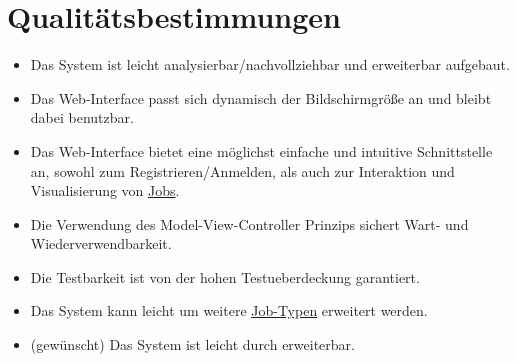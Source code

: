\section{Qualitätsbestimmungen}
\begin{itemize}    
    \item Das System ist leicht analysierbar/nachvollziehbar und erweiterbar aufgebaut.
    \item Das \gls{Web-Interface} passt sich dynamisch der Bildschirmgröße an und bleibt dabei benutzbar.
    \item Das \gls{Web-Interface} bietet eine möglichst einfache und intuitive Schnittstelle an, sowohl zum Registrieren/Anmelden, als auch zur Interaktion und Visualisierung von \hyperref[B:Jobs]{Jobs}.
    \item Die Verwendung des \gls{Model-View-Controller} Prinzips sichert Wart- und Wiederverwendbarkeit.
    \item Die Testbarkeit ist von der hohen \gls{Testueberdeckung} garantiert.
    \item Das System kann leicht um weitere \hyperref[B:Job-Typ]{Job-Typen} erweitert werden.
    \item (gewünscht) Das System ist leicht durch  erweiterbar.
\end{itemize}


